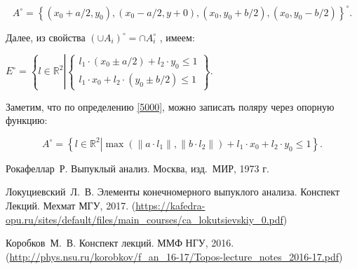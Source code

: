 \documentclass[11pt]{article}
\theoremstyle{definition}
\begin{document}
        \[
        A^{\circ} = \left\{(x_0 + a/2, y_0), (x_0 - a/2, y+0), (x_0, y_0 + b/2), (x_0, y_0 - b/2)\right\}^{\circ}. 
        \] 
        
        Далее, из свойства $(\cup A_i)^{\circ} = \cap A_i^{\circ}$ \cite[c.~29--30]{korobkov}, имеем: 
        
        $E^{\circ} = \left\{l \in \mathbb{R}^2 \left| 
         \begin{cases}
        l_1\cdot (x_0 \pm a/2) + l_2\cdot y_0 \leqslant 1 \\
        l_1\cdot x_0 + l_2\cdot (y_0 \pm b/2) \leqslant 1 
         \end{cases}\right. \right\}. $
         
        Заметим, что по определению \ref{5000}, можно записать поляру через опорную функцию:
        
        \[
        A^{\circ} = \left\{l \in \left. \mathbb{R}^2 \right| \max(\|a\cdot l_1\|, \|b\cdot l_2\|) + l_1\cdot x_0 + l_2\cdot y_0 \leqslant 1 \right\}.
        \]
    
    \newpage
\begin{thebibliography}{}
    
     Рокафеллар~Р. Выпуклый анализ. Москва, изд.~МИР, 1973 г. 
    
     Локуциевский~Л.~В. Элементы конечномерного выпуклого
    анализа. Конспект Лекций. Мехмат МГУ, 2017. (\url{https://kafedra-opu.ru/sites/default/files/main_courses/ca_lokutsievskiy_0.pdf})
    
      Коробков~М.~В. Конспект лекций. ММФ НГУ, 2016. (\url{http://phys.nsu.ru/korobkov/f_an_16-17/Topos-lecture_notes_2016-17.pdf})
    
    \end{thebibliography}
    
\end{document}
